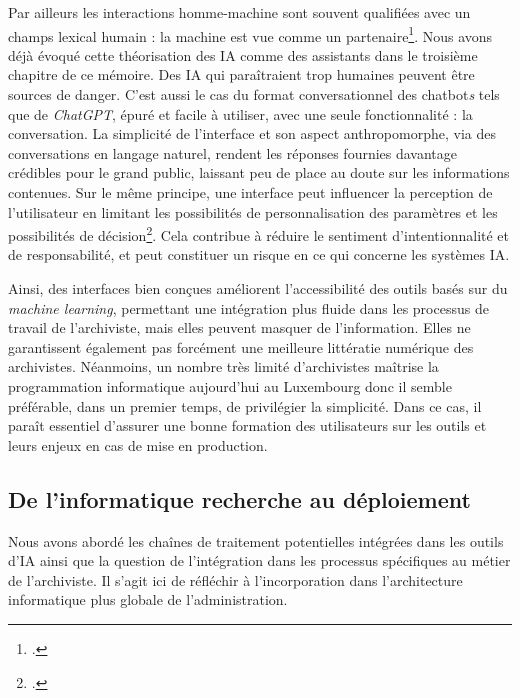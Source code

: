 Par ailleurs les interactions homme-machine sont souvent qualifiées avec un champs lexical humain : la machine est vue comme un partenaire\footcite{pucheu_effacer_2018}. Nous avons déjà évoqué cette théorisation des IA comme des assistants dans le troisième chapitre de ce mémoire. Des IA qui paraîtraient trop humaines peuvent être sources de danger. C'est aussi le cas du format conversationnel des \gls{chatbot}\textit{s} tels que de \emph{ChatGPT}, épuré et facile à utiliser, avec une seule fonctionnalité : la conversation. La simplicité de l'interface et son aspect anthropomorphe, via des conversations en langage naturel, rendent les réponses fournies davantage crédibles pour le grand public, laissant peu de place au doute sur les informations contenues. Sur le même principe, une interface peut influencer la perception de l'utilisateur en limitant les possibilités de personnalisation des paramètres et les possibilités de décision\footcite{pucheu_effacer_2018}. Cela contribue à réduire le sentiment d'intentionnalité et de responsabilité, et peut constituer un risque en ce qui concerne les systèmes IA. 

Ainsi, des interfaces bien conçues améliorent l'accessibilité des outils basés sur du \emph{machine learning}, permettant une intégration plus fluide dans les processus de travail de l'archiviste, mais elles peuvent masquer de l'information. Elles ne garantissent également pas forcément une meilleure littératie numérique des archivistes. Néanmoins, un nombre très limité d'archivistes maîtrise la programmation informatique aujourd'hui au Luxembourg donc il semble préférable, dans un premier temps, de privilégier la simplicité. Dans ce cas, il paraît essentiel d'assurer une bonne formation des utilisateurs sur les outils et leurs enjeux en cas de mise en production.


\subsection{De l'informatique recherche au déploiement}


Nous avons abordé les chaînes de traitement potentielles intégrées dans les outils d'IA ainsi que la question de l'intégration dans les processus spécifiques au métier de l'archiviste. Il s'agit ici de réfléchir à l'incorporation dans l'architecture informatique plus globale de l'administration.

